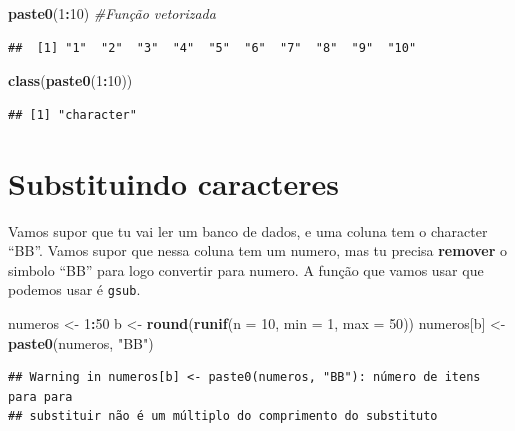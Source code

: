 \documentclass[]{book}
\newenvironment{Shaded}{\begin{snugshade}}{\end{snugshade}}
\newcommand{\KeywordTok}[1]{\textcolor[rgb]{0.13,0.29,0.53}{\textbf{#1}}}
\newcommand{\DataTypeTok}[1]{\textcolor[rgb]{0.13,0.29,0.53}{#1}}
\newcommand{\DecValTok}[1]{\textcolor[rgb]{0.00,0.00,0.81}{#1}}
\newcommand{\StringTok}[1]{\textcolor[rgb]{0.31,0.60,0.02}{#1}}
\newcommand{\CommentTok}[1]{\textcolor[rgb]{0.56,0.35,0.01}{\textit{#1}}}
\newcommand{\OperatorTok}[1]{\textcolor[rgb]{0.81,0.36,0.00}{\textbf{#1}}}
\newcommand{\NormalTok}[1]{#1}
\theoremstyle{definition}
\theoremstyle{definition}
\theoremstyle{definition}
\theoremstyle{remark}
\begin{document}
\begin{Shaded}
\begin{Highlighting}[]
\KeywordTok{paste0}\NormalTok{(}\DecValTok{1}\OperatorTok{:}\DecValTok{10}\NormalTok{) }\CommentTok{#Função vetorizada}
\end{Highlighting}
\end{Shaded}

\begin{verbatim}
##  [1] "1"  "2"  "3"  "4"  "5"  "6"  "7"  "8"  "9"  "10"
\end{verbatim}

\begin{Shaded}
\begin{Highlighting}[]
\KeywordTok{class}\NormalTok{(}\KeywordTok{paste0}\NormalTok{(}\DecValTok{1}\OperatorTok{:}\DecValTok{10}\NormalTok{))}
\end{Highlighting}
\end{Shaded}

\begin{verbatim}
## [1] "character"
\end{verbatim}

\section{Substituindo caracteres}\label{substituindo-caracteres}

Vamos supor que tu vai ler um banco de dados, e uma coluna tem o
character ``BB''. Vamos supor que nessa coluna tem um numero, mas tu
precisa \textbf{remover} o simbolo ``BB'' para logo convertir para
numero. A função que vamos usar que podemos usar é \texttt{gsub}.

\begin{Shaded}
\begin{Highlighting}[]
\NormalTok{numeros <-}\StringTok{ }\DecValTok{1}\OperatorTok{:}\DecValTok{50}
\NormalTok{b <-}\StringTok{ }\KeywordTok{round}\NormalTok{(}\KeywordTok{runif}\NormalTok{(}\DataTypeTok{n =} \DecValTok{10}\NormalTok{, }\DataTypeTok{min =} \DecValTok{1}\NormalTok{, }\DataTypeTok{max =} \DecValTok{50}\NormalTok{))}
\NormalTok{numeros[b] <-}\StringTok{ }\KeywordTok{paste0}\NormalTok{(numeros, }\StringTok{"BB"}\NormalTok{)}
\end{Highlighting}
\end{Shaded}

\begin{verbatim}
## Warning in numeros[b] <- paste0(numeros, "BB"): número de itens para para
## substituir não é um múltiplo do comprimento do substituto
\end{verbatim}
\end{document}
